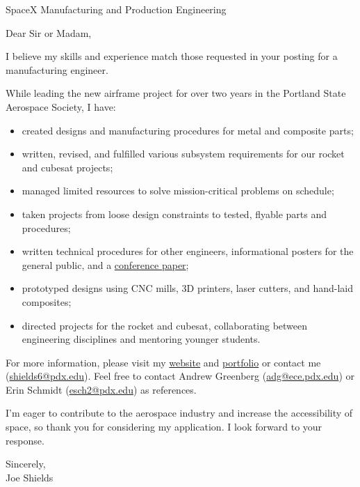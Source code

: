 \documentclass[letterpaper]{letter}
\begin{document}
\large

\begin{letter}{SpaceX Manufacturing and Production Engineering}
\opening{Dear Sir or Madam,}

I believe my skills and experience match those requested in your posting for a manufacturing engineer. 

While leading the new airframe project for over two years in the Portland State Aerospace Society, I have: 
\begin{itemize}
	\item created designs and manufacturing procedures for metal and composite parts;
	\item written, revised, and fulfilled various subsystem requirements for our rocket and cubesat projects;
	\item managed limited resources to solve mission-critical problems on schedule;
	\item taken projects from loose design constraints to tested, flyable parts and procedures;
	\item written technical procedures for other engineers, informational posters for the general public, and a \href{http://arc.aiaa.org/doi/pdf/10.2514/6.2016-5365}{conference paper};
	\item prototyped designs using CNC mills, 3D printers, laser cutters, and hand-laid composites;
	\item directed projects for the rocket and cubesat, collaborating between engineering disciplines and mentoring younger students.
\end{itemize}
For more information, please visit my \href{http://joedang.github.io}{website} and \href{http://github.com/Joedang/Portfolio}{portfolio} or contact me (\href{mailto:shields6@pdx.edu}{shields6@pdx.edu}).
Feel free to contact Andrew Greenberg (\href{mailto:adg@ece.pdx.edu}{adg@ece.pdx.edu}) or Erin Schmidt (\href{mailto:esch2@pdx.edu}{esch2@pdx.edu}) as references. 

I'm eager to contribute to the aerospace industry and increase the accessibility of space, so thank you for considering my application. I look forward to your response. 

\closing{Sincerely,\\ Joe Shields}
\end{letter}
\end{document}
